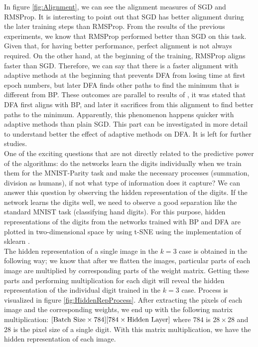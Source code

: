 \documentclass[a4paper, nobind]{templates/ociamthesis}
\begin{document}
\noindent In figure \ref{fig:Alignment}, we can see the alignment measures of SGD and RMSProp. It is interesting to point out that SGD has better alignment during the later training steps than RMSProp. From the results of the previous experiments, we know that RMSProp performed better than SGD on this task. Given that, for having better performance, perfect alignment is not always required. On the other hand, at the beginning of the training, RMSProp aligns faster than SGD. Therefore, we can say that there is a faster alignment with adaptive methods at the beginning that prevents DFA from losing time at first epoch numbers, but later DFA finds other paths to find the minimum that is different from BP. These outcomes are parallel to results of \cite{refinetti2021align}, it was stated that DFA first aligns with BP, and later it sacrifices from this alignment to find better paths to the minimum. Apparently, this phenomenon happens quicker with adaptive methods than plain SGD. This part can be investigated in more detail to understand better the effect of adaptive methods on DFA. It is left for further studies.\\
\noindent One of the exciting questions that are not directly related to the predictive power of the algorithms: do the networks learn the digits individually when we train them for the MNIST-Parity task and make the necessary processes (summation, division as humans), if not what type of information does it capture? We can answer this question by observing the hidden representation of the digits. If the network learns the digits well, we need to observe a good separation like the standard MNIST task (classifying hand digits). For this purpose, hidden representations of the digits from the networks trained with BP and DFA are plotted in two-dimensional space by using t-SNE using the implementation of sklearn \cite{scikit-learn}.\\
The hidden representation of a single image in the \(k=3\) case is obtained in the following way; we know that after we flatten the images, particular parts of each image are multiplied by corresponding parts of the weight matrix. Getting these parts and performing multiplication for each digit will reveal the hidden representation of the individual digit trained in the \(k=3\) case. Process is visualized in figure \ref{fig:HiddenRepProcess}. After extracting the pixels of each image and the corresponding weights, we end up with the following matrix multiplication: \([\text{Batch Size} \times 784] [784 \space \times \space \text{Hidden Layer}]\) where \(784\) is \(28 \times 28\) and \(28\) is the pixel size of a single digit. With this matrix multiplication, we have the hidden representation of each image.
\end{document}
